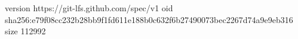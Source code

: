 version https://git-lfs.github.com/spec/v1
oid sha256:e79f08cc232b28bb9f1fd611e188b0c632f6b27490073bec2267d74a9e9eb316
size 112992
